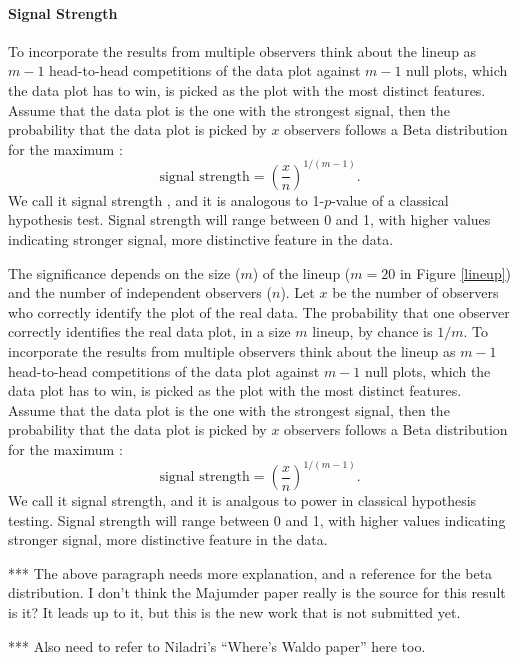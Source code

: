 \paragraph{Signal Strength}
To incorporate the results from multiple
observers think about the lineup as $m-1$ head-to-head competitions of
the data plot against $m-1$ null plots, which the data plot has to
win, is picked as the plot with the most distinct features. Assume
that the data plot is the one with the strongest signal, then the
probability that the data plot is picked by $x$ observers follows a
Beta distribution for the maximum \citet{****}:
\[
\text{signal strength} =  \left( \frac{x}{n}\right)^{1/(m-1)}.
\]
We call it signal strength \citet{majumder:2012}, and it is analogous to 1-$p$-value of a classical hypothesis test. Signal strength will range between 0 and 1, with higher values indicating stronger signal, more distinctive feature in the data.




The significance depends on the size ($m$) of
the lineup ($m=20$ in Figure \ref{lineup}) and the number of
independent observers ($n$). Let $x$ be the number of observers who
correctly identify the plot of the real data. The probability that one
observer correctly identifies the real data plot, in a size $m$
lineup, by chance is $1/m$. To incorporate the results from multiple
observers think about the lineup as $m-1$ head-to-head competitions of
the data plot against $m-1$ null plots, which the data plot has to
win, is picked as the plot with the most distinct features. Assume
that the data plot is the one with the strongest signal, then the
probability that the data plot is picked by $x$ observers follows a
Beta distribution for the maximum \citet{****}:
\[
\text{signal strength} =  \left( \frac{x}{n}\right)^{1/(m-1)}.
\]
We call it signal strength, and it is analgous to power in classical hypothesis testing. Signal strength will range between 0 and 1, with higher values indicating stronger signal, more distinctive feature in the data.

*** The above paragraph needs more explanation, and a reference for the beta distribution. I don't think the Majumder paper really is the source for this result is it? It leads up to it, but this is the new work that is not submitted yet.

*** Also need to refer to Niladri's ``Where's Waldo paper'' here too.


